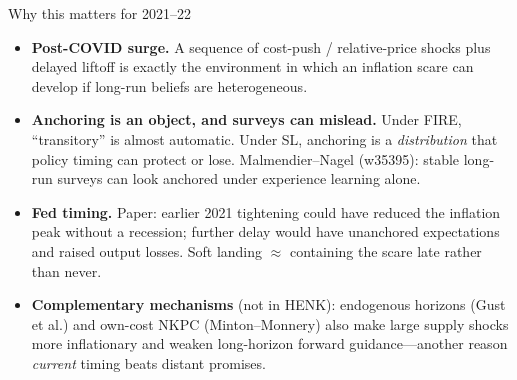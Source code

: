\documentclass[11pt,aspectratio=169]{beamer}
\begin{document}
\begin{frame}{Why this matters for 2021--22}
  \begin{itemize}
    \item \textbf{Post-COVID surge.}
          A sequence of cost-push / relative-price shocks plus delayed
          liftoff is exactly the environment in which an inflation scare
          can develop if long-run beliefs are heterogeneous.
    \item \textbf{Anchoring is an object, and surveys can mislead.}
          Under FIRE, ``transitory'' is almost automatic. Under SL,
          anchoring is a \emph{distribution} that policy timing can
          protect or lose. Malmendier--Nagel (w35395): stable long-run
          surveys can look anchored under experience learning alone.
    \item \textbf{Fed timing.}
          Paper: earlier 2021 tightening could have reduced the inflation
          peak without a recession; further delay would have unanchored
          expectations and raised output losses. Soft landing $\approx$
          containing the scare late rather than never.
    \item \textbf{Complementary mechanisms} (not in HENK): endogenous
          horizons (Gust et al.) and own-cost NKPC (Minton--Monnery)
          also make large supply shocks more inflationary and weaken
          long-horizon forward guidance---another reason \emph{current}
          timing beats distant promises.
  \end{itemize}
\end{frame}

\end{document}
